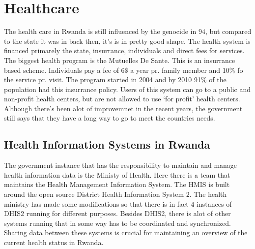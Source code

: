 \section{Healthcare}
The health care in Rwanda is still influenced by the genocide in 94, but compared to the state it was in back then, it's is in pretty good shape.
The health system is financed primarely the state, insurrance, individuals and direct fees for services.
The biggest health program is the Mutuelles De Sante. This is an insurrance based scheme.
Individuals pay a fee of 6\$ a year pr. family member and 10\% fo the service pr. visit.
The program started in 2004 and by 2010 91\% of the population had this insurrance policy.
Users of this system can go to a public and non-profit health centers, but are not allowed to use `for profit' health centers.
Although there's been alot of improvemnet in the recent years, the government still says that they have a long way to go to meet the countries needs\cite{20}.

\subsection{Health Information Systems in Rwanda}
The government instance that has the responsibility to maintain and manage health information data is the Ministy of Health. 
Here there is a team that maintains the Health Management Information System.
The HMIS  is built around the open source District Health Information System 2. 
The health ministry has made some modifications so that there is in fact 4 instances of DHIS2 running for different purposes.
Besides DHIS2, there is alot of other systems running that in some way has to be coordinated and synchronized.
Sharing data between these systems is crucial for maintaining an overview of the current health status in Rwanda.




